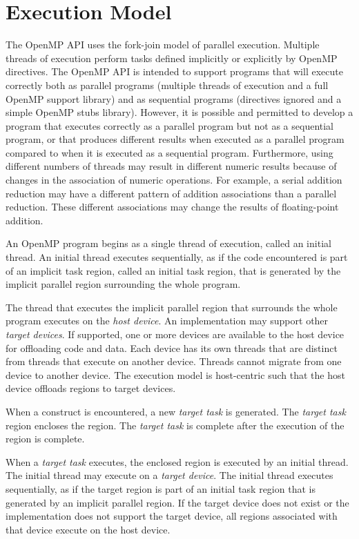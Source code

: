 \section{Execution Model}
\label{sec:Execution Model}
The OpenMP API uses the fork-join model of parallel execution. Multiple threads of
execution perform tasks defined implicitly or explicitly by OpenMP directives. The
OpenMP API is intended to support programs that will execute correctly both as parallel
programs (multiple threads of execution and a full OpenMP support library) and as
sequential programs (directives ignored and a simple OpenMP stubs library). However,
it is possible and permitted to develop a program that executes correctly as a parallel
program but not as a sequential program, or that produces different results when
executed as a parallel program compared to when it is executed as a sequential program.
Furthermore, using different numbers of threads may result in different numeric results
because of changes in the association of numeric operations. For example, a serial
addition reduction may have a different pattern of addition associations than a 
parallel reduction. These different associations may change the results of 
floating-point addition.

An OpenMP program begins as a single thread of execution, called an initial thread. 
An initial thread executes sequentially, as if the code encountered is part of an 
implicit task region, called an initial task region, that is generated by the 
implicit parallel region surrounding the whole program.

The thread that executes the implicit parallel region that surrounds the whole program
executes on the \emph{host device}. An implementation may support
other \emph{target devices}. If
supported, one or more devices are available to the host device for offloading code and
data. Each device has its own threads that are distinct from threads that execute on
another device. Threads cannot migrate from one device to another device. The
execution model is host-centric such that the host device offloads  
regions to target devices.

When a  construct is encountered, a new \emph{target task} is generated.
The \emph{target task} region encloses the  region. The 
\emph{target task} is complete after the execution of the  
region is complete.

When a \emph{target task} executes, the enclosed  region is 
executed by an initial thread.  The initial thread may execute on a 
\emph{target device}.  The initial thread executes sequentially, as if the 
target region is part of an initial task region that is generated by an 
implicit parallel region. If the target device does not exist or the 
implementation does not support the target device, all  
regions associated with that device execute on the host device.

